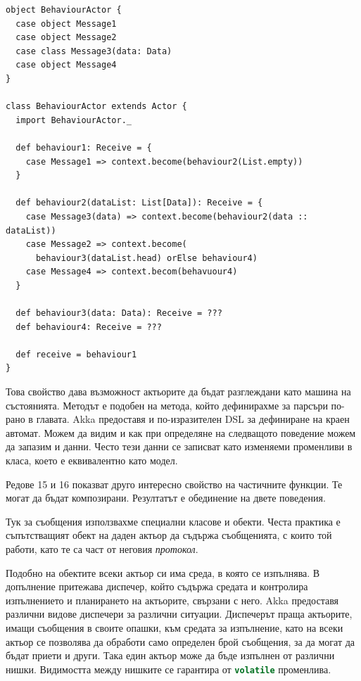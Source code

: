 \begin{lstlisting}[style=listing]
object BehaviourActor {
  case object Message1
  case object Message2
  case class Message3(data: Data)
  case object Message4
}

class BehaviourActor extends Actor {
  import BehaviourActor._

  def behaviour1: Receive = {
    case Message1 => context.become(behaviour2(List.empty))
  }
  
  def behaviour2(dataList: List[Data]): Receive = {
    case Message3(data) => context.become(behaviour2(data :: dataList))
    case Message2 => context.become(
      behaviour3(dataList.head) orElse behaviour4)
    case Message4 => context.becom(behavuour4)
  }
  
  def behaviour3(data: Data): Receive = ???
  def behaviour4: Receive = ???
  
  def receive = behaviour1
}
\end{lstlisting}

Това свойство дава възможност актьорите да бъдат разглеждани като машина на състоянията. Методът  е подобен на метода, който дефинирахме за парсъри по-рано в главата. Akka предоставя и по-изразителен DSL за дефиниране на краен автомат. Можем да видим и как при определяне на следващото поведение можем да запазим и данни. Често тези данни се записват като изменяеми променливи в класа, което е еквивалентно като модел.

Редове 15 и 16 показват друго интересно свойство на частичните функции. Те могат да бъдат композирани. Резултатът е обединение на двете поведения.

Тук за съобщения използвахме специални класове и обекти. Честа практика е съпътстващият обект на даден актьор да съдържа съобщенията, с които той работи, като те са част от неговия \emph{протокол}.

Подобно на  обектите всеки актьор си има среда, в която се изпълнява. В допълнение притежава диспечер, който съдържа средата и контролира изпълнението и планирането на актьорите, свързани с него. Akka предоставя различни видове диспечери за различни ситуации. Диспечерът праща актьорите, имащи съобщения в своите опашки, към средата за изпълнение, като на всеки актьор се позволява да обработи само определен брой съобщения, за да могат да бъдат приети и други. Така един актьор може да бъде изпълнен от различни нишки. Видимостта между нишките се гарантира от \lstinline[language=Java]|volatile| променлива.

